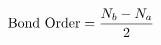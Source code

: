 \documentclass[preview]{standalone}
\begin{document}
\begin{align*}
\special{dvisvgm:raw <g id='unique000'>}\text{Bond Order} = \frac{N_b - N_a}{2}\special{dvisvgm:raw </g>}
\end{align*}
\end{document}
